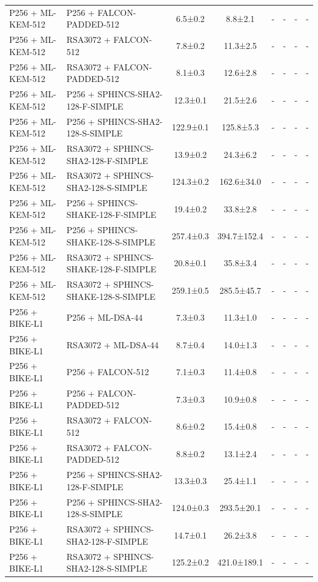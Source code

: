 \documentclass[10pt]{article}
\begin{document}
\begin{tabular}{@{}l l c c c c c c@{}}
P256 + ML-KEM-512 & P256 + FALCON-PADDED-512 & 6.5±0.2 & 8.8±2.1 & - & - & - & - \\
P256 + ML-KEM-512 & RSA3072 + FALCON-512 & 7.8±0.2 & 11.3±2.5 & - & - & - & - \\
P256 + ML-KEM-512 & RSA3072 + FALCON-PADDED-512 & 8.1±0.3 & 12.6±2.8 & - & - & - & - \\
P256 + ML-KEM-512 & P256 + SPHINCS-SHA2-128-F-SIMPLE & 12.3±0.1 & 21.5±2.6 & - & - & - & - \\
P256 + ML-KEM-512 & P256 + SPHINCS-SHA2-128-S-SIMPLE & 122.9±0.1 & 125.8±5.3 & - & - & - & - \\
P256 + ML-KEM-512 & RSA3072 + SPHINCS-SHA2-128-F-SIMPLE & 13.9±0.2 & 24.3±6.2 & - & - & - & - \\
P256 + ML-KEM-512 & RSA3072 + SPHINCS-SHA2-128-S-SIMPLE & 124.3±0.2 & 162.6±34.0 & - & - & - & - \\
P256 + ML-KEM-512 & P256 + SPHINCS-SHAKE-128-F-SIMPLE & 19.4±0.2 & 33.8±2.8 & - & - & - & - \\
P256 + ML-KEM-512 & P256 + SPHINCS-SHAKE-128-S-SIMPLE & 257.4±0.3 & 394.7±152.4 & - & - & - & - \\
P256 + ML-KEM-512 & RSA3072 + SPHINCS-SHAKE-128-F-SIMPLE & 20.8±0.1 & 35.8±3.4 & - & - & - & - \\
P256 + ML-KEM-512 & RSA3072 + SPHINCS-SHAKE-128-S-SIMPLE & 259.1±0.5 & 285.5±45.7 & - & - & - & - \\
P256 + BIKE-L1 & P256 + ML-DSA-44 & 7.3±0.3 & 11.3±1.0 & - & - & - & - \\
P256 + BIKE-L1 & RSA3072 + ML-DSA-44 & 8.7±0.4 & 14.0±1.3 & - & - & - & - \\
P256 + BIKE-L1 & P256 + FALCON-512 & 7.1±0.3 & 11.4±0.8 & - & - & - & - \\
P256 + BIKE-L1 & P256 + FALCON-PADDED-512 & 7.3±0.3 & 10.9±0.8 & - & - & - & - \\
P256 + BIKE-L1 & RSA3072 + FALCON-512 & 8.6±0.2 & 15.4±0.8 & - & - & - & - \\
P256 + BIKE-L1 & RSA3072 + FALCON-PADDED-512 & 8.8±0.2 & 13.1±2.4 & - & - & - & - \\
P256 + BIKE-L1 & P256 + SPHINCS-SHA2-128-F-SIMPLE & 13.3±0.3 & 25.4±1.1 & - & - & - & - \\
P256 + BIKE-L1 & P256 + SPHINCS-SHA2-128-S-SIMPLE & 124.0±0.3 & 293.5±20.1 & - & - & - & - \\
P256 + BIKE-L1 & RSA3072 + SPHINCS-SHA2-128-F-SIMPLE & 14.7±0.1 & 26.2±3.8 & - & - & - & - \\
P256 + BIKE-L1 & RSA3072 + SPHINCS-SHA2-128-S-SIMPLE & 125.2±0.2 & 421.0±189.1 & - & - & - & - \\

\end{tabular}
\end{document}
